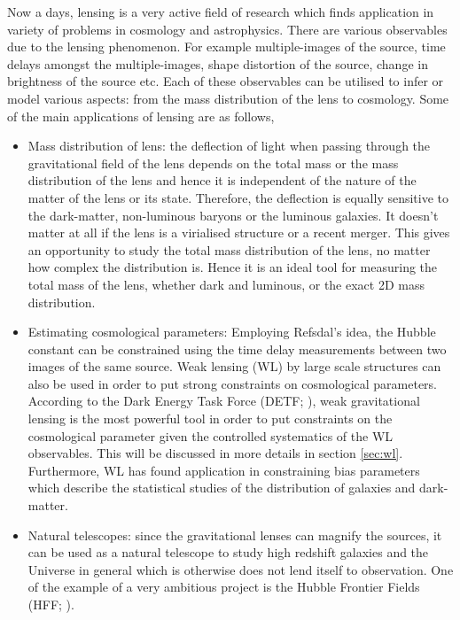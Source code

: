 Now a days, lensing is a very active field of research which finds application
in variety of problems in cosmology and astrophysics. 
There are various observables due to the lensing phenomenon. For example 
multiple-images of the source, time 
delays amongst the multiple-images, shape distortion of the source, change in brightness
of the source etc. Each of these observables can be utilised to infer or model various
aspects: from the mass distribution of the lens to cosmology. 
Some of the main applications of lensing are as follows,
\begin{itemize}
	\item Mass distribution of lens: the deflection of light when passing through
			the gravitational field of the lens depends on the total mass or the
			mass distribution of the lens and hence it is independent of the nature
			of the matter of the lens or its state. Therefore, the
			deflection is equally sensitive to the dark-matter, non-luminous baryons
			or the luminous galaxies. It doesn't matter at all if the lens is a 
			virialised structure or a recent merger. This gives an opportunity to 
			study the total mass distribution of the lens, no matter how complex 
			the distribution is. Hence it is an ideal tool for measuring the total mass
			of the lens, whether dark and luminous, or the exact 2D mass distribution. 

	\item Estimating cosmological parameters: Employing Refsdal's idea, the Hubble constant
			can be constrained using the time delay measurements between two images
			of the same source. Weak lensing (WL) by large scale structures 
			can also be used in order to put
			strong constraints on cosmological parameters. According to the Dark 
			Energy Task Force (DETF; \cite{2006astro.ph..9591A}), 
			weak gravitational lensing is the most powerful
			tool in order to put constraints on the cosmological parameter given
			the controlled systematics of the WL observables. This will be discussed
			in more details in section \ref{sec:wl}. Furthermore, WL has found application
			in constraining bias parameters which describe the statistical studies
			of the distribution of galaxies and dark-matter. 

	\item Natural telescopes: since the gravitational lenses can magnify the sources, it 
			can be used as a natural telescope to study high redshift galaxies and the Universe
			in general which is otherwise does not lend itself to observation. One of the example of a 
			very ambitious project is the Hubble Frontier Fields 
			(HFF; \cite{2014AAS...22325401L}). 
\end{itemize}


